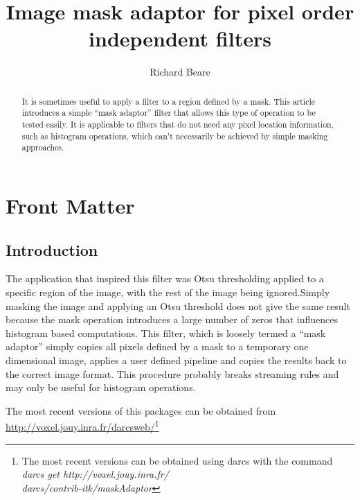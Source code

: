 \documentclass{InsightArticle}
\title{Image mask adaptor for pixel order independent filters}
\author{Richard Beare}
\begin{document}
\maketitle

\ifhtml
\chapter*{Front Matter\label{front}}
\fi


\begin{abstract}
\noindent
It is sometimes useful to apply a filter to a region defined by a
mask. This article introduces a simple ``mask adaptor'' filter that
allows this type of operation to be tested easily. It is applicable to
filters that do not need any pixel location information, such as
histogram operations, which can't necessarily be achieved by simple
masking approaches.
\end{abstract}

\tableofcontents

\section{Introduction}
 The application that inspired this filter was Otsu thresholding
 applied to a specific region of the image, with the rest of the image
 being ignored.Simply masking the image and applying an Otsu threshold
 does not give the same result because the mask operation introduces a
 large number of zeros that influences histogram based
 computations. This filter, which is loosely termed a ``mask adaptor''
 simply copies all pixels defined by a mask to a temporary one
 dimensional image, applies a user defined pipeline and copies the
 results back to the correct image format. This procedure probably
 breaks streaming rules and may only be useful for histogram
 operations.

 The most recent versions of this packages can be obtained from
 \url{http://voxel.jouy.inra.fr/darcsweb/}\footnote{ The most recent
 versions can be obtained using darcs \cite{DarcsWebSite} with the
 command {\em darcs get
 http://voxel.jouy.inra.fr/\\darcs/contrib-itk/maskAdaptor}}
\end{document}
